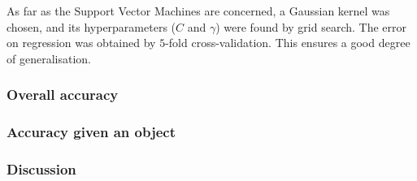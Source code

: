 As far as the Support Vector Machines are concerned, a Gaussian kernel
was chosen, and its hyperparameters ($C$ and $\gamma$) were found by
grid search. The error on regression was obtained by $5$-fold
cross-validation. This ensures a good degree of generalisation.

\subsubsection*{Overall accuracy}

\subsubsection*{Accuracy given an object}

\subsubsection*{Discussion}

